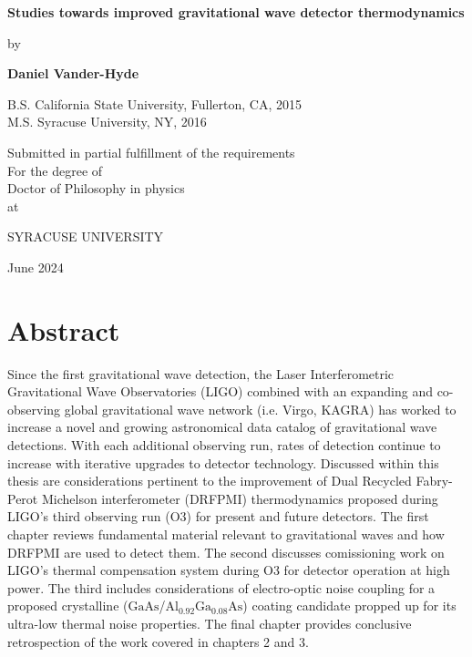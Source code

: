 \documentclass[12pt]{report}
\newcommand{\algaas}{\mathrm{Al_{0.92}Ga_{0.08}As}}
\newcommand{\gaas}{\mathrm{GaAs}}
\begin{document}
\begin{titlepage}
\begin{center}
       \vspace*{1cm}

       \textbf{\LARGE Studies towards improved gravitational wave detector thermodynamics}

       \vspace{0.5cm}
       {\large by}
            
       \vspace{0.5cm}

       \textbf{\large Daniel Vander-Hyde}


       \vspace{0.5cm}
       {\large B.S. California State University, Fullerton, CA, 2015}
       \\
       {\large M.S. Syracuse University, NY, 2016}
       
       \vspace{1.0cm}
             
       {\large Submitted in partial fulfillment of the requirements\\
       For the degree of \\
       Doctor of Philosophy in physics\\
       at}

       \vspace{0.5cm}

       {\large \uppercase{Syracuse University}}
       \vfill
     
       June 2024
            
   \end{center}
\end{titlepage}

\chapter*{Abstract}
Since the first gravitational wave detection, the Laser Interferometric Gravitational Wave Observatories (LIGO) combined with an expanding and co-observing global gravitational wave network (i.e. Virgo, KAGRA) has worked to increase a novel and growing astronomical data catalog of gravitational wave detections. With each additional observing run, rates of detection continue to increase with iterative upgrades to detector technology. Discussed within this thesis are considerations pertinent to the improvement of Dual Recycled Fabry-Perot Michelson interferometer (DRFPMI) thermodynamics proposed during LIGO's third observing run (O3) for present and future detectors. The first chapter reviews fundamental material relevant to gravitational waves and how DRFPMI are used to detect them. The second discusses comissioning work on LIGO's thermal compensation system during O3 for detector operation at high power. The third includes considerations of electro-optic noise coupling for a proposed crystalline ($\gaas$/$\algaas$) coating candidate propped up for its ultra-low thermal noise properties. The final chapter provides conclusive retrospection of the work covered in chapters 2 and 3.  
\end{document}
